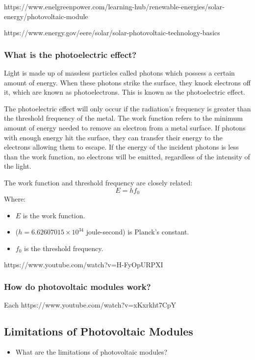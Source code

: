 \noindent https://www.enelgreenpower.com/learning-hub/renewable-energies/solar-energy/photovoltaic-module\par
\noindent https://www.energy.gov/eere/solar/solar-photovoltaic-technology-basics\par
\subsubsection{What is the photoelectric effect?}
Light is made up of massless particles called photons which possess a certain amount of energy. When these photons strike the surface, they knock electrons off it, which are known as photoelectrons. This is known as the photoelectric effect.\vspace{0.5em}

\noindent The photoelectric effect will only occur if the radiation's frequency is greater than the threshold frequency of the metal. The work function refers to the minimum amount of energy needed to remove an electron from a metal surface. If photons with enough energy hit the surface, they can transfer their energy to the electrons allowing them to escape. If the energy of the incident photons is less than the work function, no electrons will be emitted, regardless of the intensity of the light.\vspace{0.5em}

\noindent The work function and threshold frequency are closely related:
\begin{equation}
    E = hf_0
\end{equation}
Where:
\begin{itemize}
    \item $E$ is the work function.
    \item ($h = 6.62607015 \times 10^{34}$ joule-second) is Planck's constant.
    \item $f_0$ is the threshold frequency. 
\end{itemize}\vspace{0.5em}

\noindent https://www.youtube.com/watch?v=H-FyOpURPXI

\subsubsection{How do photovoltaic modules work?}
Each 
https://www.youtube.com/watch?v=xKxrkht7CpY

\subsection{Limitations of Photovoltaic Modules}
\begin{itemize}
    \item What are the limitations of photovoltaic modules?
\end{itemize}

